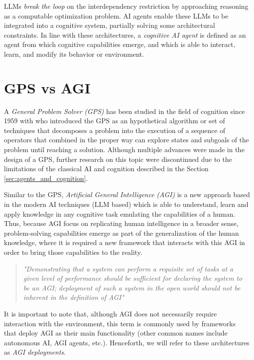 LLMs \emph{break the loop} on the interdependency restriction by approaching
reasoning as a computable optimization problem. AI agents enable these LLMs to
be integrated into a cognitive system, partially solving some architectural
constraints. In line with these architectures, a \emph{cognitive AI agent} is
defined as an agent from which cognitive capabilities emerge, and which is able
to interact, learn, and modify its behavior or environment.

\section{GPS vs AGI}
A \emph{General Problem Solver (GPS)} has been studied in the field of cognition
since 1959 with \citet{newell1959report} who introduced the GPS as an
hypothetical algorithm or set of techniques that decomposes a problem into the
execution of a sequence of operators that combined in the proper way can explore
states and subgoals of the problem until reaching a solution. Although multiple
advances were made in the design of a GPS, further research on this topic were
discontinued due to the limitations of the classical AI and cognition described
in the Section \ref{sec:agents_and_cognition}. 

Similar to the GPS, \emph{Artificial General Intelligence (AGI)} is a new
approach based in the modern AI techniques (LLM based) which is able to
understand, learn and apply knowledge in any cognitive task emulating the
capabilities of a human. Thus, because AGI focus on replicating human
intelligence in a broader sense, problem-solving capabilities emerge as part of
the generalization of the human knowledge, where it is required a new framework
that interacts with this AGI in order to bring those capabilities to the
reality.


\begin{quote}
    \small\textit{
        "Demonstrating that a system can perform a requisite set of tasks at a
        given level of performance should be sufficient for declaring the system
        to be an AGI; deployment of such a system in the open world should not
        be inherent in the definition of AGI" \citet{morris2023levels}
    }
\end{quote}

It is important to note that, although AGI does not necessarily require
interaction with the environment, this term is commonly used by frameworks that
deploy AGI as their main functionality (other common names include autonomous
AI, AGI agents, etc.). Henceforth, we will refer to these architectures as
\emph{AGI deployments}.

